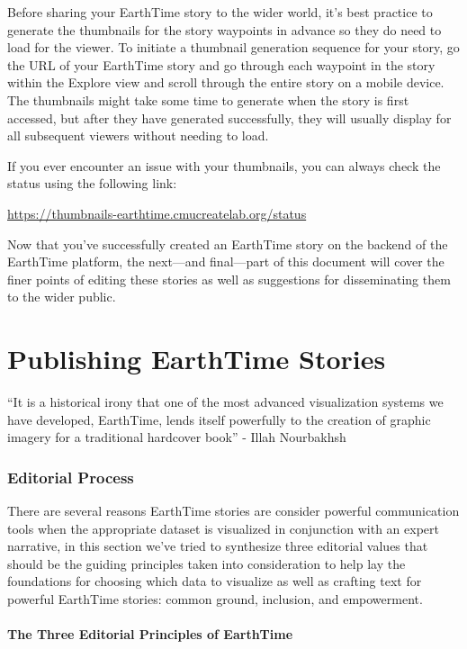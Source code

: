 \documentclass[
  12pt,
]{krantz}
\begin{document}
Before sharing your EarthTime story to the wider world, it's best practice to generate the thumbnails for the story waypoints in advance so they do need to load for the viewer. To initiate a thumbnail generation sequence for your story, go the URL of your EarthTime story and go through each waypoint in the story within the Explore view and scroll through the entire story on a mobile device. The thumbnails might take some time to generate when the story is first accessed, but after they have generated successfully, they will usually display for all subsequent viewers without needing to load.

If you ever encounter an issue with your thumbnails, you can always check the status using the following link:

\url{https://thumbnails-earthtime.cmucreatelab.org/status}

Now that you've successfully created an EarthTime story on the backend of the EarthTime platform, the next---and final---part of this document will cover the finer points of editing these stories as well as suggestions for disseminating them to the wider public.

\hypertarget{part-publishing-earthtime-stories}{%
\part{Publishing EarthTime Stories}\label{part-publishing-earthtime-stories}}

``It is a historical irony that one of the most advanced visualization systems we have developed, EarthTime, lends itself powerfully to the creation of graphic imagery for a traditional hardcover book'' - Illah Nourbakhsh

\hypertarget{editorial-process}{%
\section{Editorial Process}\label{editorial-process}}

There are several reasons EarthTime stories are consider powerful communication tools when the appropriate dataset is visualized in conjunction with an expert narrative, in this section we've tried to synthesize three editorial values that should be the guiding principles taken into consideration to help lay the foundations for choosing which data to visualize as well as crafting text for powerful EarthTime stories: common ground, inclusion, and empowerment.

\hypertarget{the-three-editorial-principles-of-earthtime}{%
\subsection{The Three Editorial Principles of EarthTime}\label{the-three-editorial-principles-of-earthtime}}
\end{document}
